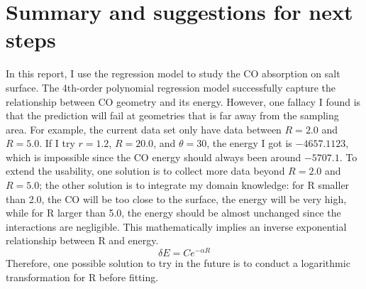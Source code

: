 \documentclass[11pt]{article}
\begin{document}
\section{Summary and suggestions for next steps}\label{section-sugg}
In this report, I use the regression model to study the CO absorption on salt surface.
The 4th-order polynomial regression model successfully capture the relationship between CO geometry and its energy.
However, one fallacy I found is that the prediction will fail at geometries that is far away from the sampling area.
For example, the current data set only have data between $R=2.0$ and $R=5.0$. 
If I try $r=1.2$, $R=20.0$, and $\theta = 30$, the energy I got is $-4657.1123$, which is impossible since the CO energy should always been around $-5707.1$. 
To extend the usability, one solution is to collect more data beyond $R=2.0$ and $R=5.0$; the other solution is to integrate my domain knowledge: for R smaller than 2.0, the CO will be too close to the surface, the energy will be very high, while for R larger than 5.0, the energy should be almost unchanged since the interactions are negligible.
This mathematically implies an inverse exponential relationship between R and energy.
$$\delta E = Ce^{-\alpha R}$$
Therefore, one possible solution to try in the future is to conduct a logarithmic transformation for R before fitting.

%
\end{document}
